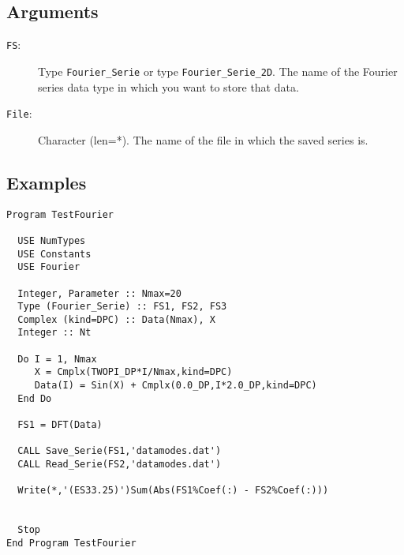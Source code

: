 \subsection{Arguments}

\begin{description}
\item[\texttt{FS}:] Type \texttt{Fourier\_Serie} or type
  \texttt{Fourier\_Serie\_2D}. The name of the Fourier series data
  type in which you want to store that data.
\item[\texttt{File}:] Character (len=*). The name of the file in which
  the saved series is.
\end{description}

\subsection{Examples}

\begin{verbatim}
Program TestFourier

  USE NumTypes
  USE Constants
  USE Fourier

  Integer, Parameter :: Nmax=20
  Type (Fourier_Serie) :: FS1, FS2, FS3
  Complex (kind=DPC) :: Data(Nmax), X
  Integer :: Nt

  Do I = 1, Nmax
     X = Cmplx(TWOPI_DP*I/Nmax,kind=DPC)
     Data(I) = Sin(X) + Cmplx(0.0_DP,I*2.0_DP,kind=DPC)
  End Do

  FS1 = DFT(Data)

  CALL Save_Serie(FS1,'datamodes.dat')
  CALL Read_Serie(FS2,'datamodes.dat')

  Write(*,'(ES33.25)')Sum(Abs(FS1%Coef(:) - FS2%Coef(:)))


  Stop
End Program TestFourier
\end{verbatim}

